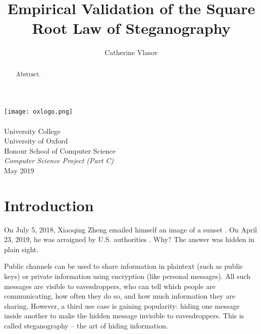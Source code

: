 \documentclass[11pt,a4paper,twoside,openright]{report}
\author{Catherine Vlasov}
\title{Empirical Validation of the Square Root Law of Steganography}
\begin{document}
\makeatletter
  \begin{titlepage}
    \vspace*{\fill}
      \begin{center}
        { \huge \bfseries \@title \par}
        \vspace{20ex}
        \texttt{[image: oxlogo.png]}
        \\[10ex]
        {\LARGE \@author}
        \\[3ex]
        {\Large University College}
        \\[1ex]
        {\Large University of Oxford}
        \\[8ex]
        {\Large Honour School of Computer Science}
        \\[1ex]
        {\Large \emph{Computer Science Project (Part C)}}
        \\[10ex]
        {\LARGE May 2019}
      \end{center}
    \vspace*{\fill}
  \end{titlepage}
\makeatother


\shipout\null


\begin{abstract}

Abstract.

\end{abstract}


\shipout\null
{}

\tableofcontents

\cleardoublepage
{}
\newpage

\chapter{Introduction}

On July 5, 2018, Xiaoqing Zheng emailed himself an image of a sunset \cite{info-sec-ge}. On April 23, 2019, he was arraigned by U.S. authorities \cite{washington-post-ge}. Why? The answer was hidden in plain sight.

Public channels can be used to share information in plaintext (such as public keys) or private information using encryption (like personal messages). All such messages are visible to eavesdroppers, who can tell which people are communicating, how often they do so, and how much information they are sharing. However, a third use case is gaining popularity: hiding one message inside another to make the hidden message invisible to eavesdroppers. This is called steganography -- the art of hiding information.
\end{document}
